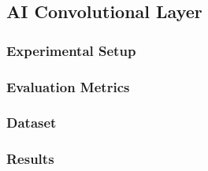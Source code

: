 \subsection{AI Convolutional Layer}

\subsubsection{Experimental Setup}

\subsubsection{Evaluation Metrics}

\subsubsection{Dataset}

\subsubsection{Results} 